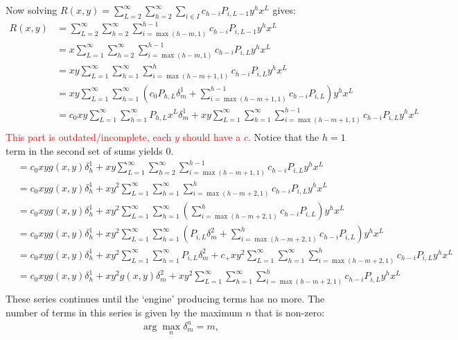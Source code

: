 		Now solving $R(x, y)= \sum_{L=2}^\infty\sum_{h=2}^\infty\sum_{i\in I} c_{h-i}P_{i, L-1}y^hx^L$ gives:
		\begin{align}
			R(x, y) &= \sum_{L=2}^\infty\sum_{h=2}^\infty\sum_{i=\max(h-m, 1)}^{h-1} c_{h-i}P_{i, L-1}y^hx^L\\
			&= x \sum_{L=1}^\infty\sum_{h=2}^\infty\sum_{i=\max(h-m, 1)}^{h-1} c_{h-i}P_{i, L}y^hx^L\\
			&= xy \sum_{L=1}^\infty\sum_{h=1}^\infty\sum_{i=\max(h-m+1, 1)}^{h} c_{h-i}P_{i, L}y^hx^L\\
			&= xy \sum_{L=1}^\infty\sum_{h=1}^\infty\left(c_0P_{h, L}\delta_m^1 + \sum_{i=\max(h-m+1, 1)}^{h-1} c_{h-i}P_{i, L}\right)y^hx^L\\
			&= c_0xy \sum_{L=1}^\infty\sum_{h=1}^\infty P_{h, L}x^L\delta_m^1 + xy \sum_{L=1}^\infty\sum_{h=1}^\infty\sum_{i=\max(h-m+1, 1)}^{h-1} c_{h-i}P_{i, L}y^hx^L\\
		\end{align}
			\textcolor{red}{This part is outdated/incomplete, each $y$ should have a $c$.}
		Notice that the $h=1$ term in the second set of sums yields 0.
		\begin{align}
			&= c_0 xy g(x, y)\delta_h^1 + xy \sum_{L=1}^\infty\sum_{h=2}^\infty\sum_{i=\max(h-m+1, 1)}^{h-1} c_{h-i}P_{i, L}y^hx^L\\
			&= c_0xy g(x, y)\delta_h^1 + xy^2 \sum_{L=1}^\infty\sum_{h=1}^\infty\sum_{i=\max(h-m+2, 1)}^{h} c_{h-i}P_{i, L}y^hx^L\\
			&= c_0xy g(x, y)\delta_h^1 + xy^2 \sum_{L=1}^\infty\sum_{h=1}^\infty\left(\sum_{i=\max(h-m+2, 1)}^{h} c_{h-i}P_{i, L}\right)y^hx^L\\
			&= c_0xy g(x, y)\delta_h^1 + xy^2 \sum_{L=1}^\infty\sum_{h=1}^\infty\left(P_{i, L}\delta_m^2 + \sum_{i=\max(h-m+2, 1)}^{h} c_{h-i}P_{i, L}\right)y^hx^L\\
			&= c_0xy g(x, y)\delta_h^1 + xy^2 \sum_{L=1}^\infty\sum_{h=1}^\infty P_{i, L}\delta_m^2 + c_+xy^2 \sum_{L=1}^\infty\sum_{h=1}^\infty\sum_{i=\max(h-m+2, 1)}^{h} c_{h-i}P_{i, L}y^hx^L\\
			&= c_0xy g(x, y)\delta_h^1 + xy^2 g(x, y)\delta_m^2 + xy^2 \sum_{L=1}^\infty\sum_{h=1}^\infty\sum_{i=\max(h-m+2, 1)}^{h} c_{h-i} P_{i, L}y^hx^L\\
		\end{align}
		These series continues until the `engine' producing terms has no more. The number of terms in this series is given by the maximum $n$ that is non-zero:
		\begin{align}
			\arg \max_n \delta_m^n = m,
		\end{align}
